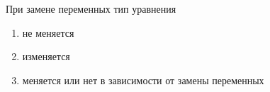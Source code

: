 При замене переменных тип уравнения

\begin{enumerate}[label=\arabic*)]
    \item не меняется
    \item изменяется
    \item меняется или нет в зависимости от замены переменных
\end{enumerate}

